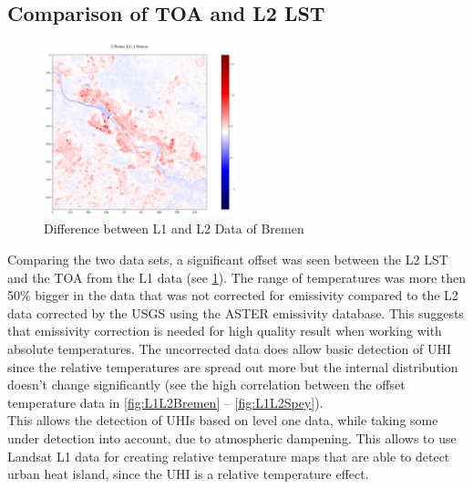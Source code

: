 \documentclass[a4paper, english]{article}
\begin{document}
\subsection{Comparison of \ac{TOA} and L2 \ac{LST}}
\begin{figure}
 \centering
    \includegraphics[width=0.5\textwidth]{img/Difference L2-L1.png} 
    \caption{Difference between L1 and L2 Data of Bremen\label{fig:t1t2diffHB}}
\end{figure}
Comparing the two data sets, a significant offset was seen between the L2 \ac{LST} and the \ac{TOA} from the L1 data (see \cref{fig:t1t2diffHB}).
%
The range of temperatures was more then 50\% bigger in the data that was not corrected for emissivity compared to the L2 data corrected by the USGS using the ASTER emissivity database. 
This suggests that emissivity correction is needed for high quality result when working with absolute temperatures. 
The uncorrected data does allow basic detection of \ac{UHI} since the relative temperatures are spread out more 
but the internal distribution doesn't change significantly (see the high correlation between the offset temperature data in \cref{fig:L1L2Bremen} -- \cref{fig:L1L2Spey}). \\
This allows the detection of \acp{UHI} based on level one data, while taking some under detection into account, due to atmospheric dampening.
This allows to use Landsat L1 data for creating relative temperature maps that are able to detect urban heat island, since the UHI is a relative temperature effect. 
\end{document}
